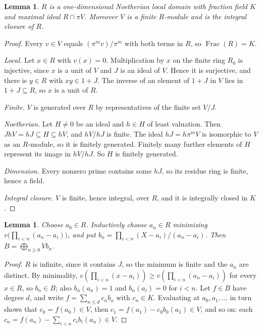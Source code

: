 \documentclass[11pt,a4paper]{article}
\theoremstyle{plain}
\newtheorem{lemma}[theorem]{Lemma}
\theoremstyle{remark}
\begin{document}
\begin{lemma}\label{lem:ring}
$R$ is a one-dimensional Noetherian local domain with fraction field $K$ and maximal ideal $R\cap\pi V$. Moreover
$V$ is a finite $R$-module and is the integral closure of $R$.
\end{lemma}

\begin{proof}
Every $v\in V$ equals $(\pi^mv)/\pi^m$ with both terms in $R$, so $\operatorname{Frac}(R)=K$.

\emph{Local.} Let $x\in R$ with $v(x)=0$. Multiplication by $x$ on the finite ring $R_0$ is injective, since $x$ is a
unit of $V$ and $J$ is an ideal of $V$. Hence it is surjective, and there is $y\in R$ with $xy\in1+J$. The inverse of
an element of $1+J$ in $V$ lies in $1+J\subseteq R$, so $x$ is a unit of $R$.

\emph{Finite.} $V$ is generated over $R$ by representatives of the finite set $V/J$.

\emph{Noetherian.} Let $H\neq0$ be an ideal and $h\in H$ of least valuation. Then $JhV=hJ\subseteq H\subseteq hV$,
and $hV/hJ$ is finite. The ideal $hJ=h\pi^mV$ is isomorphic to $V$ as an $R$-module, so it is finitely generated. Finitely many further elements of $H$ represent its image in
$hV/hJ$. So $H$ is finitely generated.

\emph{Dimension.} Every nonzero prime contains some $hJ$, so its residue ring is finite, hence a field.

\emph{Integral closure.} $V$ is finite, hence integral, over $R$, and it is integrally closed in $K$.
\end{proof}

\begin{lemma}\label{lem:newton}
Choose $a_0\in R$. Inductively choose $a_n\in R$ minimizing $v\bigl(\prod_{i<n}(a_n-a_i)\bigr)$, and put
$b_n=\prod_{i<n}(X-a_i)/(a_n-a_i)$. Then $B=\bigoplus_{n\geq0}Vb_n$.
\end{lemma}

\begin{proof}
$R$ is infinite, since it contains $J$, so the minimum is finite and the $a_n$ are distinct. By minimality,
$v(\prod_{i<n}(x-a_i))\geq v(\prod_{i<n}(a_n-a_i))$ for every $x\in R$, so $b_n\in B$; also $b_n(a_n)=1$ and
$b_n(a_i)=0$ for $i<n$. Let $f\in B$ have degree $d$, and write $f=\sum_{n\le d}c_nb_n$ with $c_n\in K$. Evaluating
at $a_0,a_1,\dots$ in turn shows that $c_0=f(a_0)\in V$, then $c_1=f(a_1)-c_0b_0(a_1)\in V$, and so on: each
$c_n=f(a_n)-\sum_{i<n}c_ib_i(a_n)\in V$.
\end{proof}
\end{document}
